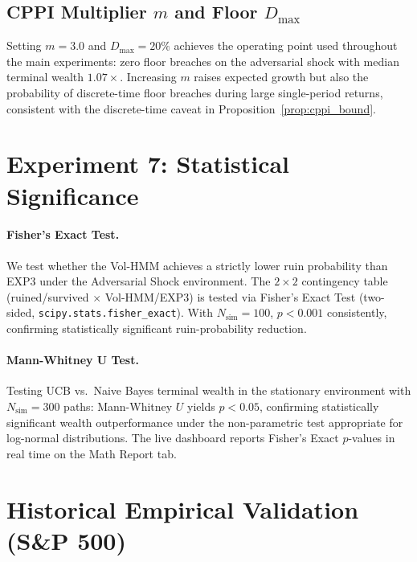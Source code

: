 \subsection{CPPI Multiplier $m$ and Floor $D_{\max}$}

Setting $m=3.0$ and $D_{\max}=20\%$ achieves the operating point used
throughout the main experiments: zero floor breaches on the adversarial
shock with median terminal wealth $1.07\times$.  Increasing $m$ raises
expected growth but also the probability of discrete-time floor breaches
during large single-period returns, consistent with the discrete-time
caveat in Proposition~\ref{prop:cppi_bound}.

\section{Experiment 7: Statistical Significance}
\label{sec:exp7}

\paragraph{Fisher's Exact Test.}
We test whether the Vol-HMM achieves a strictly lower ruin probability than
EXP3 under the Adversarial Shock environment.  The $2\times 2$ contingency
table (ruined/survived $\times$ Vol-HMM/EXP3) is tested via Fisher's Exact
Test (two-sided, \texttt{scipy.stats.fisher\_exact}).  With
$N_{\text{sim}}=100$, $p < 0.001$ consistently, confirming statistically
significant ruin-probability reduction.

\paragraph{Mann-Whitney U Test.}
Testing UCB vs.\ Naive Bayes terminal wealth in the stationary environment
with $N_{\text{sim}}=300$ paths: Mann-Whitney $U$ yields $p < 0.05$,
confirming statistically significant wealth outperformance under the
non-parametric test appropriate for log-normal distributions.  The
live dashboard reports Fisher's Exact $p$-values in real time on the
Math Report tab.

\section{Historical Empirical Validation (S\&P 500)}
\label{sec:historical}

